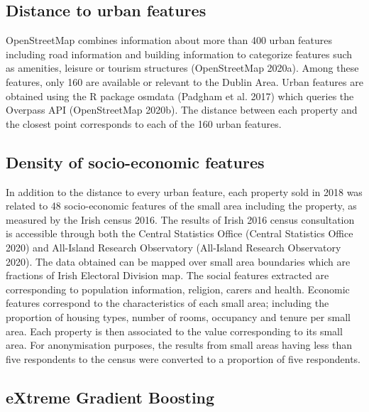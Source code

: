 \documentclass[conference,final,]{IEEEtran}
\begin{document}
\hypertarget{distance-to-urban-features}{%
\subsection{Distance to urban features}\label{distance-to-urban-features}}

OpenStreetMap combines information about more than 400 urban features including road information and building information to categorize features such as amenities, leisure or tourism structures (OpenStreetMap 2020a). Among these features, only 160 are available or relevant to the Dublin Area. Urban features are obtained using the R package osmdata (Padgham et al. 2017) which queries the Overpass API (OpenStreetMap 2020b). The distance between each property and the closest point corresponds to each of the 160 urban features.

\hypertarget{density-of-socio-economic-features}{%
\subsection{Density of socio-economic features}\label{density-of-socio-economic-features}}

In addition to the distance to every urban feature, each property sold in 2018 was related to 48 socio-economic features of the small area including the property, as measured by the Irish census 2016. The results of Irish 2016 census consultation is accessible through both the Central Statistics Office (Central Statistics Office 2020) and All-Island Research Observatory (All-Island Research Observatory 2020). The data obtained can be mapped over small area boundaries which are fractions of Irish Electoral Division map. The social features extracted are corresponding to population information, religion, carers and health. Economic features correspond to the characteristics of each small area; including the proportion of housing types, number of rooms, occupancy and tenure per small area. Each property is then associated to the value corresponding to its small area. For anonymisation purposes, the results from small areas having less than five respondents to the census were converted to a proportion of five respondents.

\hypertarget{extreme-gradient-boosting}{%
\subsection{eXtreme Gradient Boosting}\label{extreme-gradient-boosting}}
\end{document}
